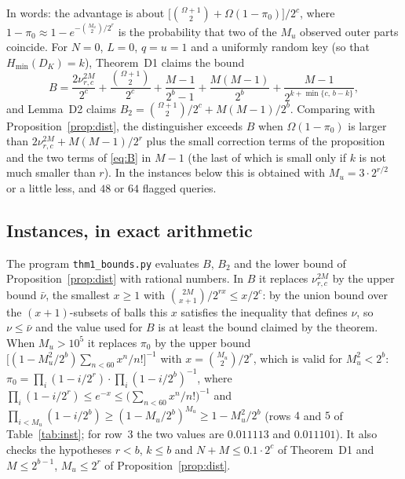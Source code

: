 \documentclass[11pt,a4paper]{article}
\theoremstyle{definition}
\theoremstyle{remark}
\newcommand{\Hmin}{H_{\min}}
\newcommand{\file}[1]{\texttt{#1}}
\begin{document}
In words: the advantage is about $\bigl[\binom{\Omega+1}{2} + \Omega(1 - \pi_0)\bigr]/2^c$, where
$1 - \pi_0 \approx 1 - e^{-\binom{M_u}{2}/2^r}$ is the probability that two of the $M_u$ observed outer parts coincide.
For $N = 0$, $L = 0$, $q = u = 1$ and a uniformly random key (so that $\Hmin(D_K) = k$), Theorem~D1 claims the bound
\begin{equation}\label{eq:B}
 B = \frac{2\nu^{2M}_{r,c}}{2^c} + \frac{\binom{\Omega+1}{2}}{2^c} + \frac{M-1}{2^b-1} + \frac{M(M-1)}{2^b} + \frac{M-1}{2^{k+\min\{c,\,b-k\}}} ,
\end{equation}
and Lemma~D2 claims $B_2 = \binom{\Omega+1}{2}/2^c + M(M-1)/2^b$. Comparing with Proposition~\ref{prop:dist}, the
distinguisher exceeds $B$ when $\Omega(1 - \pi_0)$ is larger than $2\nu^{2M}_{r,c} + M(M-1)/2^r$ plus the small correction terms
of the proposition and the two terms of \eqref{eq:B} in $M - 1$ (the last of which is small only if $k$ is not much smaller than $r$). In the
instances below this is obtained with $M_u = 3 \cdot 2^{r/2}$ or a little less, and $48$ or $64$ flagged queries.

\subsection{Instances, in exact arithmetic}
The program \file{thm1\_bounds.py} evaluates $B$, $B_2$ and the lower bound of Proposition~\ref{prop:dist} with rational
numbers. In $B$ it replaces $\nu^{2M}_{r,c}$ by the upper bound $\bar\nu$, the smallest $x \ge 1$ with
$\binom{2M}{x+1}/2^{rx} \le x/2^c$: by the union bound over the $(x+1)$-subsets of balls this $x$ satisfies the
inequality that defines $\nu$, so $\nu \le \bar\nu$ and the value used for $B$ is at least the bound claimed by the
theorem. When $M_u > 10^5$ it replaces $\pi_0$ by the upper bound
$\bigl[(1 - M_u^2/2^b)\sum_{n < 60} x^n/n!\bigr]^{-1}$ with $x = \binom{M_u}{2}/2^r$, which is valid for $M_u^2 < 2^b$:
$\pi_0 = \prod_i (1 - i/2^r) \cdot \prod_i (1 - i/2^b)^{-1}$, where $\prod_i (1 - i/2^r) \le e^{-x} \le \bigl(\sum_{n<60} x^n/n!\bigr)^{-1}$ and
$\prod_{i < M_u} (1 - i/2^b) \ge (1 - M_u/2^b)^{M_u} \ge 1 - M_u^2/2^b$ (rows $4$ and $5$ of Table~\ref{tab:inst}; for row~$3$ the two values
are $0.011113$ and $0.011101$). It also checks the hypotheses $r < b$, $k \le b$ and $N + M \le 0.1 \cdot 2^c$ of Theorem~D1 and
$M \le 2^{b-1}$, $M_u \le 2^r$ of Proposition~\ref{prop:dist}.
\end{document}
